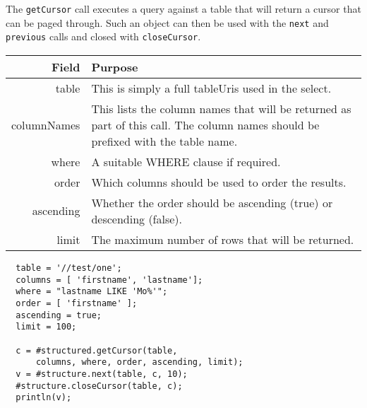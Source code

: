 The \verb+getCursor+ call executes a query against a table that will return a cursor that can be paged through. Such an
object can then be used with the \verb+next+ and \verb+previous+ calls and closed with \verb+closeCursor+.

\begin{table}[H]
\begin{center}
\begin{tabular}{r p{10cm}}
  Field & Purpose \\
  \hline
  table & This is simply a full tableUris used in the select. \\
  columnNames & This lists the column names that will be returned as part of this call. The column names should be prefixed with the table name. \\
  where & A suitable WHERE clause if required. \\
  order & Which columns should be used to order the results. \\
  ascending & Whether the order should be ascending (true) or descending (false). \\
  limit & The maximum number of rows that will be returned. \\
\end{tabular}
\end{center}
\end{table}

\begin{Verbatim}
  table = '//test/one';
  columns = [ 'firstname', 'lastname'];
  where = "lastname LIKE 'Mo%'";
  order = [ 'firstname' ];
  ascending = true;
  limit = 100;

  c = #structured.getCursor(table,
      columns, where, order, ascending, limit);
  v = #structure.next(table, c, 10);
  #structure.closeCursor(table, c);
  println(v);
\end{Verbatim}
